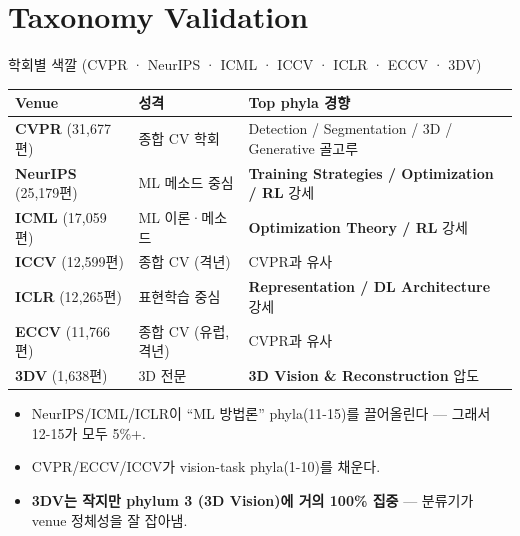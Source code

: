 \documentclass[aspectratio=169,t]{beamer}
\newcommand{\hot}[1]{\textcolor{accentorange}{\textbf{#1}}}
\newcommand{\cool}[1]{\textcolor{accentblue}{\textbf{#1}}}
\begin{document}
\section{Taxonomy Validation}

\begin{frame}{학회별 색깔 (CVPR · NeurIPS · ICML · ICCV · ICLR · ECCV · 3DV)}
\small
\begin{tabular}{@{}lll@{}}
\toprule
\textbf{Venue} & \textbf{성격} & \textbf{Top phyla 경향} \\
\midrule
\textbf{CVPR}  (31{,}677편)& 종합 CV 학회        & Detection / Segmentation / 3D / Generative 골고루 \\
\textbf{NeurIPS} (25{,}179편)& ML 메소드 중심    & \hot{Training Strategies / Optimization / RL} 강세 \\
\textbf{ICML} (17{,}059편)& ML 이론·메소드      & \hot{Optimization Theory / RL} 강세 \\
\textbf{ICCV} (12{,}599편)& 종합 CV (격년)      & CVPR과 유사 \\
\textbf{ICLR} (12{,}265편)& 표현학습 중심      & \hot{Representation / DL Architecture} 강세 \\
\textbf{ECCV} (11{,}766편)& 종합 CV (유럽, 격년)& CVPR과 유사 \\
\textbf{3DV}   (1{,}638편)& 3D 전문            & \hot{3D Vision \& Reconstruction} 압도 \\
\bottomrule
\end{tabular}
\vfill
\begin{itemize}\small
\item NeurIPS/ICML/ICLR이 ``ML 방법론'' phyla(11-15)를 끌어올린다 — 그래서 12-15가 모두 5\%+.
\item CVPR/ECCV/ICCV가 vision-task phyla(1-10)를 채운다.
\item \cool{3DV는 작지만 phylum 3 (3D Vision)에 거의 100\% 집중} — 분류기가 venue 정체성을 잘 잡아냄.
\end{itemize}
\end{frame}
\end{document}

